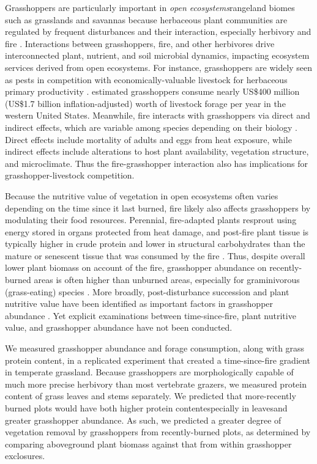 \documentclass[referee, 
	            sn-basic]
           {sn-jnl}
\begin{document}
\begin{linenumbers}
Grasshoppers are particularly important in \emph{open ecosystems}\textemdash rangeland biomes such as grasslands and savannas because herbaceous plant communities are regulated by frequent disturbances and their interaction, especially herbivory and fire \citep{bond2022}. 
Interactions between grasshoppers, fire, and other herbivores drive interconnected plant, nutrient, and soil microbial dynamics, impacting ecosystem services derived from open ecosystems.
For instance, grasshoppers are widely seen as pests in competition with economically-valuable livestock for herbaceous primary productivity \citep{zhang2019}. 
\citet{hewitt1983} estimated grasshoppers consume nearly US\$400 million (US\$1.7 billion inflation-adjusted) worth of livestock forage per year in the western United States.  
Meanwhile, fire interacts with grasshoppers via direct and indirect effects, which are variable among species depending on their biology \citep[e.g.][]{vermeire2004}. 
Direct effects include mortality of adults and eggs from heat exposure, while indirect effects include alterations to host plant availability, vegetation structure, and microclimate.
Thus the fire-grasshopper interaction also has implications for grasshopper-livestock competition. 

Because the nutritive value of vegetation in open ecosystems often varies depending on the time since it last burned, fire likely also affects grasshoppers by modulating their food resources. 
Perennial, fire-adapted plants resprout using energy stored in organs protected from heat damage, and post-fire plant tissue is typically higher in crude protein and lower in structural carbohydrates than the mature or senescent tissue that was consumed by the fire \citep{mcgranahan2021}. 
Thus, despite overall lower plant biomass on account of the fire, grasshopper abundance on recently-burned areas is often higher than unburned areas, especially for graminivorous (grass-eating) species \citep{meyer2002}. 
More broadly, post-disturbance succession and plant nutritive value have been identified as important factors in grasshopper abundance \citep{fartmann2012, schirmel2019}. 
Yet explicit examinations between time-since-fire, plant nutritive value, and grasshopper abundance have not been conducted. 

We measured grasshopper abundance and forage consumption, along with grass protein content, in a replicated experiment that created a time-since-fire gradient in temperate grassland.  
Because grasshoppers are morphologically capable of much more precise herbivory than most vertebrate grazers, we measured protein content of grass leaves and stems separately.
We predicted that more-recently burned plots would have both higher protein content\textemdash especially in leaves\textemdash and greater grasshopper abundance. 
As such, we predicted a greater degree of vegetation removal by grasshoppers from recently-burned plots, as determined by comparing aboveground plant biomass against that from within grasshopper exclosures. 


\end{linenumbers}
\end{document}
